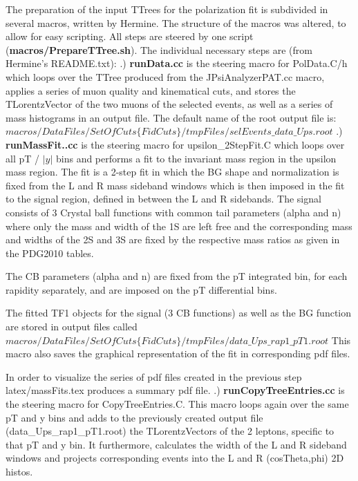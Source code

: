 \documentclass{article}
\begin{document}
The preparation of the input TTrees for the polarization fit is subdivided in several macros, written by Hermine. The structure of the macros was altered, to allow for easy scripting. All steps are steered by one script ({\bf macros/PrepareTTree.sh}). The individual necessary steps are (from Hermine's README.txt):
\newline
{}.) {\bf runData.cc} is the steering macro for PolData.C/h which loops over
the TTree produced from the JPsiAnalyzerPAT.cc macro, applies a series
of muon quality and kinematical cuts, and stores the TLorentzVector of
the two muons of the selected events, as well as a series of mass
histograms in an output file. The default name of the root output file is:
\newline
\newline
	   $macros/DataFiles/SetOfCuts\{FidCuts\}/tmpFiles/selEvents\_data\_Ups.root$
\newline
{}.) {\bf runMassFit..cc} is the steering macro for upsilon\_2StepFit.C which
loops over all pT / $|y|$ bins and performs a fit to the invariant mass
region in the upsilon mass region. The fit is a 2-step fit in which
the BG shape and normalization is fixed from the L and R mass sideband
windows which is then imposed in the fit to the signal region, defined
in between the L and R sidebands. The signal consists of 3 Crystal ball
functions with common tail parameters (alpha and n) where only the
mass and width of the 1S are left free and the corresponding mass and
widths of the 2S and 3S are fixed by the respective mass ratios as
given in the PDG2010 tables. 

The CB parameters (alpha and n) are fixed from the pT integrated bin,
for each rapidity separately, and are imposed on the pT differential
bins. 

The fitted TF1 objects for the signal (3 CB functions) as well as the
BG function are stored in output files called
\newline
\newline
   $macros/DataFiles/SetOfCuts\{FidCuts\}/tmpFiles/data\_Ups\_rap1\_pT1.root$
\newline
\newline
This macro also saves the graphical representation of the fit in
corresponding pdf files.

In order to visualize the series of pdf files created in the
previous step latex/massFits.tex produces a summary pdf file.
\newline
{}.) {\bf runCopyTreeEntries.cc} is the steering macro for
CopyTreeEntries.C. This macro loops again over the same pT and y bins
and adds to the previously created output file
(data\_Ups\_rap1\_pT1.root) the TLorentzVectors of the 2 leptons,
specific to that pT and y bin. It furthermore, calculates the width of
the L and R sideband windows and projects corresponding events into
the L and R (cosTheta,phi) 2D histos.
\end{document}
